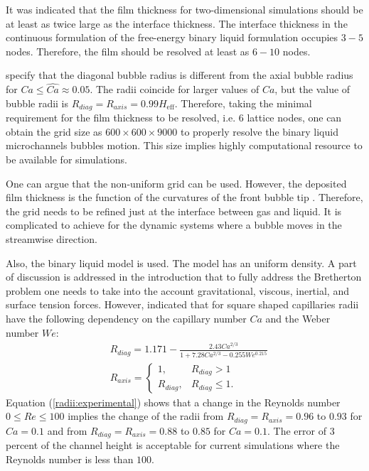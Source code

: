 \documentclass{article}
\begin{document}
It was indicated \cite{kuzmin-binary2d} that the film thickness for two-dimensional simulations should be at least as twice large
as the interface thickness. The interface thickness in the continuous formulation of the
free-energy binary liquid formulation occupies $3-5$ nodes. Therefore, the film should be
resolved at least as $6-10$ nodes. 

\cite{heil-threedim} specify that the diagonal bubble radius is different from the
axial bubble radius for $Ca\leq \widehat{Ca}\approx 0.05$. The radii coincide for larger values of
$Ca$, but the value of bubble radii is $R_{diag}=R_{axis}=0.99 H_{\mathrm{eff}}$. Therefore, taking the minimal requirement for the film thickness to be
resolved, i.e. $6$ lattice nodes, one can obtain the grid size as $600\times 600 \times 9000 $ to properly resolve the binary liquid microchannels bubbles motion. This size implies highly computational resource to be available for simulations.

One can argue that the non-uniform grid can be used. However, the deposited film thickness is the function of the curvatures of the front bubble tip \cite{bretherton}. Therefore, the grid needs to be refined just at the interface between gas and liquid. It is complicated to achieve for the dynamic systems where a bubble moves in the streamwise direction.

Also, the binary liquid model is used. The model has an uniform density. A part of discussion is addressed in the introduction that to fully address the Bretherton problem one needs to take into the account gravitational, viscous, inertial, and surface tension forces. However,  \citet{shikazono-square} indicated that for square shaped capillaries radii have the
following dependency on the capillary number $Ca$ and the Weber number $We$:
\begin{equation}
\label{radii:experimental}
\begin{aligned}
&R_{diag}=1.171-\frac{2.43 Ca^{2/3}}{1+7.28 Ca^{2/3}-0.255 We^{0.215}}\\
&R_{axis}=
\begin{cases}
1, &R_{diag}>1\\
R_{diag}, &R_{diag}\leq 1.
\end{cases}
\end{aligned}
\end{equation}
Equation (\ref{radii:experimental}) shows that a change in the Reynolds number $0\leq Re \leq 100$ implies the change of the radii from $R_{diag}=R_{axis}=0.96$ to $0.93$ for $Ca=0.1$ and from $R_{diag}=R_{axis}=0.88$ to $0.85$ for $Ca=0.1$. The error of $3$ percent of the channel height is acceptable for current simulations where the Reynolds number is less than {\color{red}$100$}.
\end{document}
